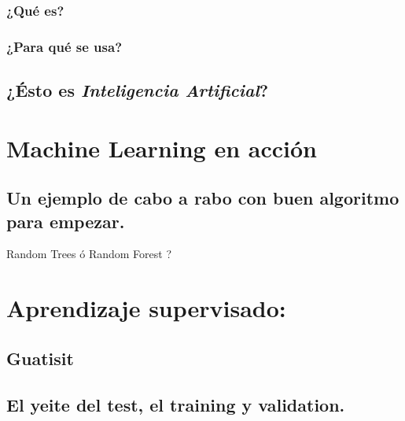 \documentclass[]{book}
\begin{document}
\hypertarget{que-es}{%
\subsection{¿Qué es?}\label{que-es}}

\hypertarget{para-que-se-usa}{%
\subsection{¿Para qué se usa?}\label{para-que-se-usa}}

\hypertarget{esto-es-inteligencia-artificial}{%
\section{\texorpdfstring{¿Ésto es \emph{Inteligencia Artificial}?}{¿Ésto es Inteligencia Artificial?}}\label{esto-es-inteligencia-artificial}}

\hypertarget{machine-learning-en-accion}{%
\chapter{Machine Learning en acción}\label{machine-learning-en-accion}}

\hypertarget{un-ejemplo-de-cabo-a-rabo-con-buen-algoritmo-para-empezar.}{%
\section{Un ejemplo de cabo a rabo con buen algoritmo para empezar.}\label{un-ejemplo-de-cabo-a-rabo-con-buen-algoritmo-para-empezar.}}

Random Trees ó Random Forest ?

\hypertarget{aprendizaje-supervisado}{%
\chapter{Aprendizaje supervisado:}\label{aprendizaje-supervisado}}

\hypertarget{guatisit}{%
\section{Guatisit}\label{guatisit}}

\hypertarget{el-yeite-del-test-el-training-y-validation.}{%
\section{El yeite del test, el training y validation.}\label{el-yeite-del-test-el-training-y-validation.}}
\end{document}
